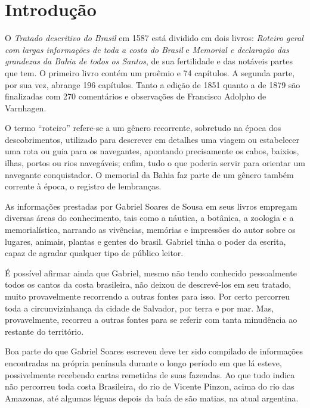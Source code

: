 \documentclass[12pt]{extarticle}
\begin{document}
\tableofcontents

\section{Introdução}



O \textit{Tratado descritivo do Brasil} em 1587 está dividido em dois livros: \textit{Roteiro geral com largas informações de toda a costa do Brasil} e \textit{Memorial e declaração das grandezas da Bahia de todos os Santos}, de sua fertilidade e das notáveis partes que tem. O primeiro livro contém um proêmio e 74 capítulos. A segunda parte, por sua vez, abrange 196 capítulos. Tanto a edição de 1851 quanto a de 1879 são finalizadas com 270 comentários e observações de Francisco Adolpho de Varnhagen.


O termo “roteiro” refere-se a um gênero recorrente, sobretudo na época dos descobrimentos, utilizado para descrever em detalhes uma viagem ou estabelecer uma rota ou guia para os navegantes, apontando precisamente os cabos, baixios, ilhas, portos ou rios navegáveis; enfim, tudo o que poderia servir para orientar um navegante conquistador. O memorial da Bahia faz parte de um gênero também corrente à época, o registro de lembranças.

As informações prestadas por Gabriel Soares de Sousa em seus livros empregam diversas áreas do conhecimento, tais como a náutica, a botânica, a zoologia e a memorialística, narrando as vivências, memórias e impressões do autor sobre os lugares, animais, plantas e gentes do brasil. Gabriel tinha o poder da escrita, capaz de agradar qualquer tipo de público leitor.

É possível afirmar ainda que Gabriel, mesmo não tendo conhecido pessoalmente todos os cantos da costa brasileira, não deixou de descrevê-los em seu tratado, muito provavelmente recorrendo a outras fontes para isso. Por certo percorreu toda a circunvizinhança da cidade de Salvador, por terra e por mar. Mas, provavelmente, recorreu a outras fontes para se referir com tanta minudência ao restante do território.

Boa parte do que Gabriel Soares escreveu deve ter sido compilado de informações encontradas na própria península durante o longo período em que lá esteve, possivelmente recebendo cartas remetidas de suas fazendas. Ao que tudo indica não percorreu toda costa Brasileira, do rio de Vicente Pinzon, acima do rio das Amazonas, até algumas léguas depois da baía de são matias, na atual argentina. 
\end{document}
